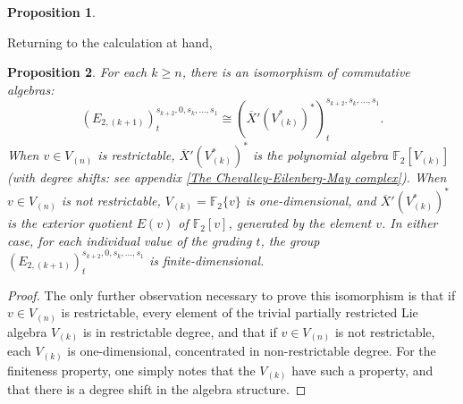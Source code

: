 \documentclass[11pt]{amsart}
\theoremstyle{plain}
\newtheorem{thm}{Theorem}[section]
\newtheorem{prop}[thm]{Proposition}
\theoremstyle{definition}
\renewcommand{\to}{\longrightarrow}
\newcommand{\calW}{\mathcal{W}}
\newcommand{\calL}{\mathcal{L}}
\newcommand{\calM}{\mathcal{M}}
\theoremstyle{plain}
\newcommand{\UEAX}{\overline{X}'}%
\newcommand{\F}{\mathbb{F}}
\begin{document}
\begin{Calculations of HWn for n nonzero}
\begin{prop}
\end{prop}
Returning to the calculation at hand,
\begin{prop}\label{calculation in internal dimension zero}
For each $k\geq n$, there is an isomorphism of commutative algebras:
\[(E_{2,(k+1)})^{s_{k+2},0,s_k,\ldots,s_1}_{t}\cong(\UEAX(V_{(k)}^*)^*)^{s_{k+2},s_k,\ldots,s_1}_t.\]
When $v\in V_{(n)}$ is restrictable,  $\UEAX(V_{(k)}^*)^*$ is the polynomial algebra $\F_2[V_{(k)}]$ (with degree shifts: see appendix \ref{The Chevalley-Eilenberg-May complex}). When $v\in V_{(n)}$ is not restrictable, $V_{(k)}=\F_{2}\{v\}$ is one-dimensional, and $\UEAX(V_{(k)}^*)^*$ is the exterior quotient $E(v)$ of $\F_2[v]$, generated by the element $v$. In either case, for each individual value of the grading $t$, the group $(E_{2,(k+1)})^{s_{k+2},0,s_k,\ldots,s_1}_{t}$ is finite-dimensional.
\end{prop}
\begin{proof}
The only further observation necessary to prove this isomorphism is that if $v\in V_{(n)}$ is restrictable, every element of the trivial partially restricted Lie algebra $V_{(k)}$ is in restrictable degree, and that if $v\in V_{(n)}$ is not restrictable, each $V_{(k)}$ is one-dimensional, concentrated in non-restrictable degree. For the finiteness property, one simply notes that the $V_{(k)}$ have such a property, and that there is a degree shift in the algebra structure.
\end{proof}


\end{Calculations of HWn for n nonzero}
\end{document}
